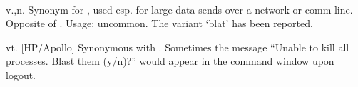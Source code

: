 \ 

\begin{inparaenum}
    \item v.,n. Synonym for , used esp. for large data sends over
        a network or comm line. Opposite of . Usage: uncommon.
        The variant `blat' has been reported.
    \item vt. [HP/Apollo] Synonymous with . Sometimes the
        message ``Unable to kill all processes. Blast them (y/n)?'' would appear
        in the command window upon logout.
\end{inparaenum}

